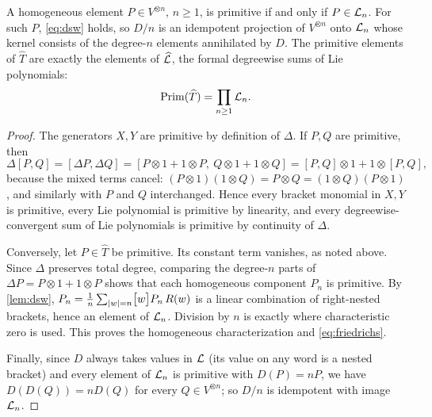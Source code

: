 \begin{theorem}\label{thm:friedrichs}
A homogeneous element $P\in V^{\otimes n}$, $n\geq1$, is primitive if and
only if $P\in\mathcal{L}_n$. For such $P$, \eqref{eq:dsw} holds, so $D/n$ is an
idempotent projection of $V^{\otimes n}$ onto $\mathcal{L}_n$ whose kernel consists
of the degree-$n$ elements annihilated by $D$. The primitive elements of
$\widehat T$ are exactly the elements of $\widehat{\mathcal{L}}$, the formal
degreewise sums of Lie polynomials:
\begin{equation}\label{eq:friedrichs}
 \operatorname{Prim}(\widehat T)=\prod_{n\geq1}\mathcal{L}_n.
\end{equation}
\end{theorem}
\begin{proof}
The generators $X,Y$ are primitive by definition of $\Delta$. If $P,Q$ are
primitive, then
\[
 \Delta[P,Q]=[\Delta P,\Delta Q]
 =[P\otimes1+1\otimes P,\ Q\otimes1+1\otimes Q]
 =[P,Q]\otimes1+1\otimes[P,Q],
\]
because the mixed terms cancel: $(P\otimes1)(1\otimes Q)=P\otimes Q
=(1\otimes Q)(P\otimes1)$, and similarly with $P$ and $Q$ interchanged.
Hence every bracket monomial in $X,Y$ is primitive, every Lie polynomial is
primitive by linearity, and every degreewise-convergent sum of Lie
polynomials is primitive by continuity of $\Delta$.

Conversely, let $P\in\widehat T$ be primitive. Its constant term vanishes,
as noted above. Since $\Delta$ preserves total degree, comparing the
degree-$n$ parts of $\Delta P=P\otimes1+1\otimes P$ shows that each
homogeneous component $P_n$ is primitive. By \cref{lem:dsw},
$P_n=\frac1n\sum_{|w|=n}\bigl[w\bigr]P_n\,R(w)$ is a linear combination of
right-nested brackets, hence an element of $\mathcal{L}_n$. Division by $n$ is
exactly where characteristic zero is used. This proves the homogeneous
characterization and \eqref{eq:friedrichs}.

Finally, since $D$ always takes values in $\mathcal{L}$ (its value on any word is a
nested bracket) and every element of $\mathcal{L}_n$ is primitive with $D(P)=nP$,
we have $D(D(Q))=nD(Q)$ for every $Q\in V^{\otimes n}$; so $D/n$ is
idempotent with image $\mathcal{L}_n$.
\end{proof}

